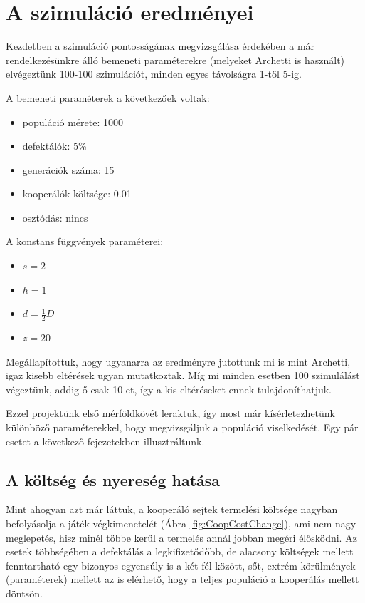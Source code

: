 
\section{A szimuláció eredményei}

Kezdetben a szimuláció pontosságának megvizsgálása érdekében a már rendelkezésünkre álló bemeneti paraméterekre (melyeket Archetti is használt\cite{archetti2013evolutionary}) elvégeztünk 100-100 szimulációt, minden egyes távolságra 1-től 5-ig.

\begin{multicols}{2}
	A bemeneti paraméterek a következőek voltak:
	\begin{itemize}[noitemsep]
		\item populáció mérete: 1000
		\item defektálók: 5\%
		\item generációk száma: 15
		\item kooperálók költsége: 0.01
		\item osztódás: nincs
	\end{itemize}
	A konstans függvények paraméterei:
	\begin{itemize}[noitemsep]
		\item $s = 2$
		\item $h = 1$
		\item $d = \frac{1}{2}D$
		\item $z = 20$
	\end{itemize}	
\end{multicols}

Megállapítottuk, hogy ugyanarra az eredményre jutottunk mi is mint Archetti\cite{archetti2013evolutionary}, igaz kisebb eltérések ugyan mutatkoztak. Míg mi minden esetben 100 szimulálást végeztünk, addig ő csak 10-et, így a kis eltéréseket ennek tulajdoníthatjuk.

Ezzel projektünk első mérföldkövét leraktuk, így most már kísérletezhetünk különböző paraméterekkel, hogy megvizsgáljuk a populáció viselkedését. Egy pár esetet a következő fejezetekben illusztráltunk.

\subsection{A költség és nyereség hatása}

Mint ahogyan azt már láttuk, a kooperáló sejtek termelési költsége nagyban befolyásolja a játék végkimenetelét (Ábra \ref{fig:CoopCostChange}), ami nem nagy meglepetés, hisz minél többe kerül a termelés annál jobban megéri élősködni. Az esetek többségében a defektálás a legkifizetődőbb, de alacsony költségek mellett fenntartható egy bizonyos egyensúly is a két fél között, sőt, extrém körülmények (paraméterek) mellett az is elérhető, hogy a teljes populáció a kooperálás mellett döntsön.

